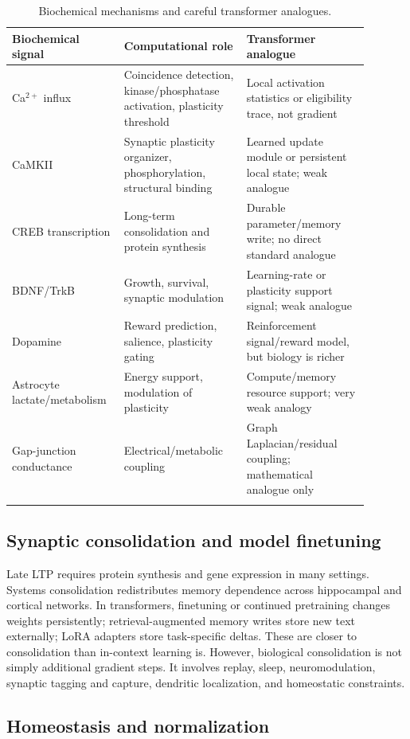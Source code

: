 \documentclass[11pt]{article}
\newcommand{\1}{\mathbf{1}}
\begin{document}
\begin{longtable}{p{0.25\linewidth}p{0.32\linewidth}p{0.32\linewidth}}
\toprule
Biochemical signal & Computational role & Transformer analogue \\
\midrule
Ca$^{2+}$ influx & Coincidence detection, kinase/phosphatase activation, plasticity threshold & Local activation statistics or eligibility trace, not gradient \\
CaMKII & Synaptic plasticity organizer, phosphorylation, structural binding & Learned update module or persistent local state; weak analogue \\
CREB transcription & Long-term consolidation and protein synthesis & Durable parameter/memory write; no direct standard analogue \\
BDNF/TrkB & Growth, survival, synaptic modulation & Learning-rate or plasticity support signal; weak analogue \\
Dopamine & Reward prediction, salience, plasticity gating & Reinforcement signal/reward model, but biology is richer \\
Astrocyte lactate/metabolism & Energy support, modulation of plasticity & Compute/memory resource support; very weak analogy \\
Gap-junction conductance & Electrical/metabolic coupling & Graph Laplacian/residual coupling; mathematical analogue only \\
\bottomrule
\caption{Biochemical mechanisms and careful transformer analogues.}
\end{longtable}

\subsection{Synaptic consolidation and model finetuning}

Late LTP requires protein synthesis and gene expression in many settings. Systems consolidation redistributes memory dependence across hippocampal and cortical networks. In transformers, finetuning or continued pretraining changes weights persistently; retrieval-augmented memory writes store new text externally; LoRA adapters store task-specific deltas. These are closer to consolidation than in-context learning is. However, biological consolidation is not simply additional gradient steps. It involves replay, sleep, neuromodulation, synaptic tagging and capture, dendritic localization, and homeostatic constraints.

\subsection{Homeostasis and normalization}
\end{document}
